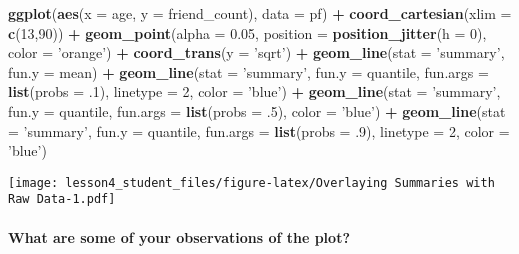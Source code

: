 \documentclass[]{article}
\newenvironment{Shaded}{\begin{snugshade}}{\end{snugshade}}
\newcommand{\KeywordTok}[1]{\textcolor[rgb]{0.13,0.29,0.53}{\textbf{#1}}}
\newcommand{\DataTypeTok}[1]{\textcolor[rgb]{0.13,0.29,0.53}{#1}}
\newcommand{\DecValTok}[1]{\textcolor[rgb]{0.00,0.00,0.81}{#1}}
\newcommand{\FloatTok}[1]{\textcolor[rgb]{0.00,0.00,0.81}{#1}}
\newcommand{\StringTok}[1]{\textcolor[rgb]{0.31,0.60,0.02}{#1}}
\newcommand{\OperatorTok}[1]{\textcolor[rgb]{0.81,0.36,0.00}{\textbf{#1}}}
\newcommand{\NormalTok}[1]{#1}
\let\oldparagraph\paragraph
\renewcommand{\paragraph}[1]{\oldparagraph{#1}\mbox{}}
\begin{document}
\begin{Shaded}
\begin{Highlighting}[]
\KeywordTok{ggplot}\NormalTok{(}\KeywordTok{aes}\NormalTok{(}\DataTypeTok{x =}\NormalTok{ age, }\DataTypeTok{y =}\NormalTok{ friend_count), }\DataTypeTok{data =}\NormalTok{ pf) }\OperatorTok{+}
\StringTok{  }\KeywordTok{coord_cartesian}\NormalTok{(}\DataTypeTok{xlim =} \KeywordTok{c}\NormalTok{(}\DecValTok{13}\NormalTok{,}\DecValTok{90}\NormalTok{)) }\OperatorTok{+}
\StringTok{  }\KeywordTok{geom_point}\NormalTok{(}\DataTypeTok{alpha =} \FloatTok{0.05}\NormalTok{,}
             \DataTypeTok{position =} \KeywordTok{position_jitter}\NormalTok{(}\DataTypeTok{h =} \DecValTok{0}\NormalTok{),}
             \DataTypeTok{color =} \StringTok{'orange'}\NormalTok{) }\OperatorTok{+}
\StringTok{  }\KeywordTok{coord_trans}\NormalTok{(}\DataTypeTok{y =} \StringTok{'sqrt'}\NormalTok{) }\OperatorTok{+}\StringTok{ }
\StringTok{  }\KeywordTok{geom_line}\NormalTok{(}\DataTypeTok{stat =} \StringTok{'summary'}\NormalTok{, }\DataTypeTok{fun.y =}\NormalTok{ mean) }\OperatorTok{+}
\StringTok{  }\KeywordTok{geom_line}\NormalTok{(}\DataTypeTok{stat =} \StringTok{'summary'}\NormalTok{, }\DataTypeTok{fun.y =}\NormalTok{ quantile, }\DataTypeTok{fun.args =} \KeywordTok{list}\NormalTok{(}\DataTypeTok{probs =}\NormalTok{ .}\DecValTok{1}\NormalTok{),}
            \DataTypeTok{linetype =} \DecValTok{2}\NormalTok{, }\DataTypeTok{color =} \StringTok{'blue'}\NormalTok{) }\OperatorTok{+}
\StringTok{  }\KeywordTok{geom_line}\NormalTok{(}\DataTypeTok{stat =} \StringTok{'summary'}\NormalTok{, }\DataTypeTok{fun.y =}\NormalTok{ quantile, }\DataTypeTok{fun.args =} \KeywordTok{list}\NormalTok{(}\DataTypeTok{probs =}\NormalTok{ .}\DecValTok{5}\NormalTok{),}
            \DataTypeTok{color =} \StringTok{'blue'}\NormalTok{) }\OperatorTok{+}
\StringTok{  }\KeywordTok{geom_line}\NormalTok{(}\DataTypeTok{stat =} \StringTok{'summary'}\NormalTok{, }\DataTypeTok{fun.y =}\NormalTok{ quantile, }\DataTypeTok{fun.args =} \KeywordTok{list}\NormalTok{(}\DataTypeTok{probs =}\NormalTok{ .}\DecValTok{9}\NormalTok{),}
            \DataTypeTok{linetype =} \DecValTok{2}\NormalTok{, }\DataTypeTok{color =} \StringTok{'blue'}\NormalTok{)}
\end{Highlighting}
\end{Shaded}

\texttt{[image: lesson4\_student\_files/figure-latex/Overlaying Summaries with Raw Data-1.pdf]}

\paragraph{What are some of your observations of the
plot?}\label{what-are-some-of-your-observations-of-the-plot}
\end{document}
